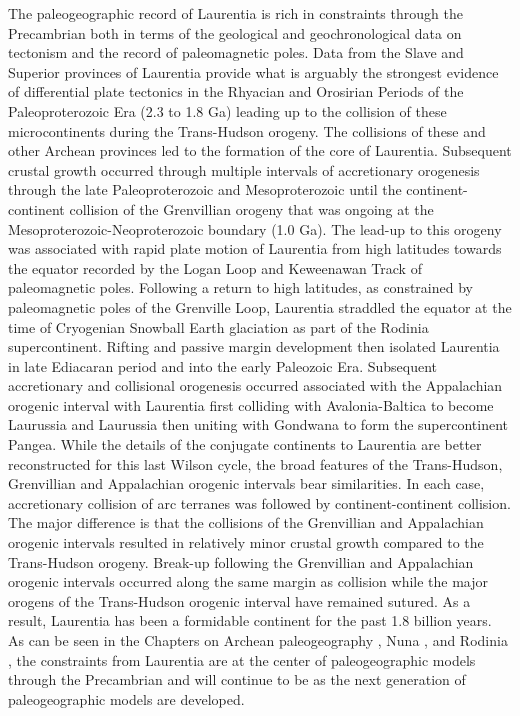 \documentclass[twocolumn, switch]{article} %
\begin{document}
The paleogeographic record of Laurentia is rich in constraints through the Precambrian both in terms of the geological and geochronological data on tectonism and the record of paleomagnetic poles. Data from the Slave and Superior provinces of Laurentia provide what is arguably the strongest evidence of differential plate tectonics in the Rhyacian and Orosirian Periods of the Paleoproterozoic Era (2.3 to 1.8 Ga) leading up to the collision of these microcontinents during the Trans-Hudson orogeny. The collisions of these and other Archean provinces led to the formation of the core of Laurentia. Subsequent crustal growth occurred through multiple intervals of accretionary orogenesis through the late Paleoproterozoic and Mesoproterozoic until the continent-continent collision of the Grenvillian orogeny that was ongoing at the Mesoproterozoic-Neoproterozoic boundary (1.0 Ga). The lead-up to this orogeny was associated with rapid plate motion of Laurentia from high latitudes towards the equator recorded by the Logan Loop and Keweenawan Track of paleomagnetic poles. Following a return to high latitudes, as constrained by paleomagnetic poles of the Grenville Loop, Laurentia straddled the equator at the time of Cryogenian Snowball Earth glaciation as part of the Rodinia supercontinent. Rifting and passive margin development then isolated Laurentia in late Ediacaran period and into the early Paleozoic Era. Subsequent accretionary and collisional orogenesis occurred associated with the Appalachian orogenic interval with Laurentia first colliding with Avalonia-Baltica to become Laurussia and Laurussia then uniting with Gondwana to form the supercontinent Pangea. While the details of the conjugate continents to Laurentia are better reconstructed for this last Wilson cycle, the broad features of the Trans-Hudson, Grenvillian and Appalachian orogenic intervals bear similarities. In each case, accretionary collision of arc terranes was followed by continent-continent collision. The major difference is that the collisions of the Grenvillian and Appalachian orogenic intervals resulted in relatively minor crustal growth compared to the Trans-Hudson orogeny. Break-up following the Grenvillian and Appalachian orogenic intervals occurred along the same margin as collision while the major orogens of the Trans-Hudson orogenic interval have remained sutured. As a result, Laurentia has been a formidable continent for the past 1.8 billion years. As can be seen in the Chapters on Archean paleogeography \citep{Salminen2021b}, Nuna \citep{Elming2021a}, and Rodinia \citep{Evans2021b}, the constraints from Laurentia are at the center of paleogeographic models through the Precambrian and will continue to be as the next generation of paleogeographic models are developed.
\end{document}
